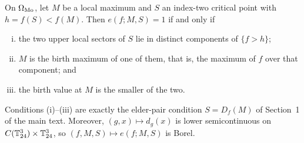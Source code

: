 \begin{lemma}\label{lem:selection-mark}
On $\Omega_{\rm Mo}$, let $M$ be a local maximum and $S$ an index-two critical point with $h=f(S)<f(M)$. Then $e(f;M,S)=1$ if and only if
\begin{enumerate}[(i)]
\item the two upper local sectors of $S$ lie in distinct components of $\{f>h\}$;
\item $M$ is the birth maximum of one of them, that is, the maximum of $f$ over that component; and
\item the birth value at $M$ is the smaller of the two.
\end{enumerate}
Conditions (i)--(iii) are exactly the elder-pair condition $S=D_f(M)$ of Section~1 of the main text. Moreover, $(g,x)\mapsto d_g(x)$ is lower semicontinuous on $C(\mathbb T^3_{24})\times\mathbb T^3_{24}$, so $(f,M,S)\mapsto e(f;M,S)$ is Borel.
\end{lemma}

